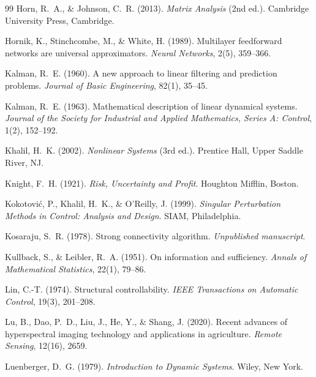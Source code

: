\documentclass[a4paper, 12pt, twoside, openright]{report}
\theoremstyle{definition}
\theoremstyle{definition}
\begin{document}
\begin{thebibliography}{99}
Horn, R.~A., \& Johnson, C.~R. (2013).
\newblock \emph{Matrix Analysis} (2nd ed.).
\newblock Cambridge University Press, Cambridge.

Hornik, K., Stinchcombe, M., \& White, H. (1989).
\newblock Multilayer feedforward networks are universal approximators.
\newblock \emph{Neural Networks}, 2(5), 359--366.

Kalman, R.~E. (1960).
\newblock A new approach to linear filtering and prediction problems.
\newblock \emph{Journal of Basic Engineering}, 82(1), 35--45.

Kalman, R.~E. (1963).
\newblock Mathematical description of linear dynamical systems.
\newblock \emph{Journal of the Society for Industrial and Applied Mathematics, Series A: Control}, 1(2), 152--192.

Khalil, H.~K. (2002).
\newblock \emph{Nonlinear Systems} (3rd ed.).
\newblock Prentice Hall, Upper Saddle River, NJ.

Knight, F.~H. (1921).
\newblock \emph{Risk, Uncertainty and Profit}.
\newblock Houghton Mifflin, Boston.

Kokotovi{\'c}, P., Khalil, H.~K., \& O'Reilly, J. (1999).
\newblock \emph{Singular Perturbation Methods in Control: Analysis and Design}.
\newblock SIAM, Philadelphia.

Kosaraju, S.~R. (1978).
\newblock Strong connectivity algorithm.
\newblock \emph{Unpublished manuscript}.

Kullback, S., \& Leibler, R.~A. (1951).
\newblock On information and sufficiency.
\newblock \emph{Annals of Mathematical Statistics}, 22(1), 79--86.

Lin, C.-T. (1974).
\newblock Structural controllability.
\newblock \emph{IEEE Transactions on Automatic Control}, 19(3), 201--208.

Lu, B., Dao, P.~D., Liu, J., He, Y., \& Shang, J. (2020).
\newblock Recent advances of hyperspectral imaging technology and applications in agriculture.
\newblock \emph{Remote Sensing}, 12(16), 2659.

Luenberger, D.~G. (1979).
\newblock \emph{Introduction to Dynamic Systems}.
\newblock Wiley, New York.


\end{thebibliography}
\end{document}
